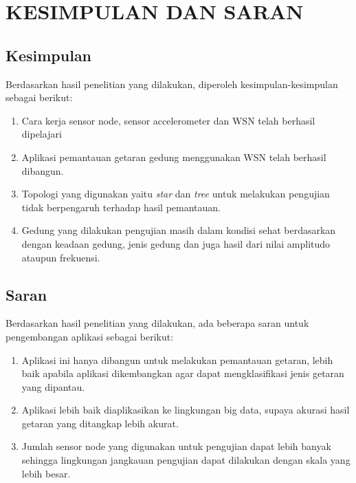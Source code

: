 \chapter{KESIMPULAN DAN SARAN}

\section{Kesimpulan}
Berdasarkan hasil penelitian yang dilakukan, diperoleh kesimpulan-kesimpulan sebagai berikut:
\begin{enumerate}
    \item Cara kerja sensor node, sensor accelerometer dan WSN telah berhasil dipelajari
    \item Aplikasi pemantauan getaran gedung menggunakan WSN telah berhasil dibangun.
    \item Topologi yang digunakan yaitu \textit{star} dan \textit{tree} untuk melakukan pengujian tidak berpengaruh terhadap hasil pemantauan.
    \item Gedung yang dilakukan pengujian masih dalam kondisi sehat berdasarkan dengan keadaan gedung, jenis gedung dan juga hasil dari nilai amplitudo ataupun frekuensi.
\end{enumerate}

\section{Saran}
Berdasarkan hasil penelitian yang dilakukan, ada beberapa saran untuk pengembangan aplikasi sebagai berikut:
\begin{enumerate}
    \item Aplikasi ini hanya dibangun untuk melakukan pemantauan getaran, lebih baik apabila aplikasi dikembangkan agar dapat  mengklasifikasi jenis getaran yang dipantau.
    
    \item Aplikasi lebih baik diaplikasikan ke lingkungan big data, supaya akurasi hasil getaran yang ditangkap lebih akurat. 
    
    \item Jumlah sensor node yang digunakan untuk pengujian dapat lebih banyak sehingga lingkungan jangkauan pengujian dapat dilakukan dengan skala yang lebih besar.
\end{enumerate}